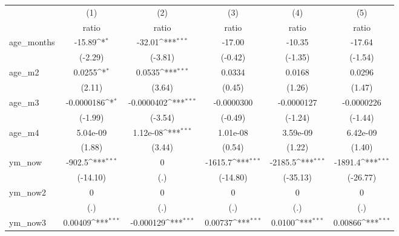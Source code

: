 {
\def\sym#1{\ifmmode^{#1}\else\(^{#1}\)\fi}
\begin{tabular}{l*{5}{c}}
\hline\hline
                    &\multicolumn{1}{c}{(1)}&\multicolumn{1}{c}{(2)}&\multicolumn{1}{c}{(3)}&\multicolumn{1}{c}{(4)}&\multicolumn{1}{c}{(5)}\\
                    &\multicolumn{1}{c}{ratio}&\multicolumn{1}{c}{ratio}&\multicolumn{1}{c}{ratio}&\multicolumn{1}{c}{ratio}&\multicolumn{1}{c}{ratio}\\
\hline
age\_months          &      -15.89\sym{*}  &      -32.01\sym{***}&      -17.00         &      -10.35         &      -17.64         \\
                    &     (-2.29)         &     (-3.81)         &     (-0.42)         &     (-1.35)         &     (-1.54)         \\
age\_m2              &      0.0255\sym{*}  &      0.0535\sym{***}&      0.0334         &      0.0168         &      0.0296         \\
                    &      (2.11)         &      (3.64)         &      (0.45)         &      (1.26)         &      (1.47)         \\
age\_m3              &  -0.0000186\sym{*}  &  -0.0000402\sym{***}&  -0.0000300         &  -0.0000127         &  -0.0000226         \\
                    &     (-1.99)         &     (-3.54)         &     (-0.49)         &     (-1.24)         &     (-1.44)         \\
age\_m4              &    5.04e-09         &    1.12e-08\sym{***}&    1.01e-08         &    3.59e-09         &    6.42e-09         \\
                    &      (1.88)         &      (3.44)         &      (0.54)         &      (1.22)         &      (1.40)         \\
ym\_now              &      -902.5\sym{***}&           0         &     -1615.7\sym{***}&     -2185.5\sym{***}&     -1891.4\sym{***}\\
                    &    (-14.10)         &         (.)         &    (-14.80)         &    (-35.13)         &    (-26.77)         \\
ym\_now2             &           0         &           0         &           0         &           0         &           0         \\
                    &         (.)         &         (.)         &         (.)         &         (.)         &         (.)         \\
ym\_now3             &     0.00409\sym{***}&   -0.000129\sym{***}&     0.00737\sym{***}&      0.0100\sym{***}&     0.00866\sym{***}\\

\end{tabular}}
